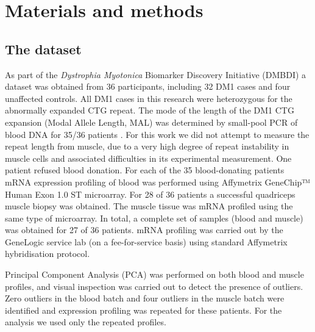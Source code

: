 \documentclass[10pt,letterpaper]{article}
\begin{document}

\section*{Materials and methods}
\subsection*{The dataset} \label{the_dataset}
As part of the {\it Dystrophia Myotonica} Biomarker Discovery Initiative (DMBDI) a dataset was obtained from 36 participants, including 32 DM1 cases and four unaffected controls. All DM1 cases in this research were heterozygous for the abnormally expanded CTG repeat. The mode of the length of the DM1 CTG expansion (Modal Allele Length, MAL) was determined by small-pool PCR of blood DNA for 35/36 patients \cite{Monckton1995}. For this work we did not attempt to measure the repeat length from muscle, due to a very high degree of repeat instability in muscle cells \cite{Thornton2014} and associated difficulties in its experimental measurement. One patient refused blood donation. For each of the 35 blood-donating patients mRNA expression profiling of blood was performed using Affymetrix GeneChip™ Human Exon 1.0 ST microarray. For 28 of 36 patients a successful quadriceps muscle biopsy was obtained. The muscle tissue was mRNA profiled using the same type of microarray. In total, a complete set of samples (blood and muscle) was obtained for 27 of 36 patients. mRNA profiling was carried out by the GeneLogic service lab (on a fee-for-service basis) using standard Affymetrix hybridisation protocol.

Principal Component Analysis (PCA) was performed on both blood and muscle profiles, and visual inspection was carried out to detect the presence of outliers. Zero outliers in the blood batch and four outliers in the muscle batch were identified and expression profiling was repeated for these patients. For the analysis we used only the repeated profiles.
\end{document}
